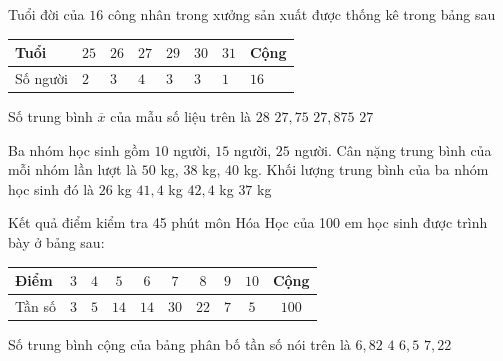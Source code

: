 \begin{ex}%
	Tuổi đời của $16$ công nhân trong xưởng sản xuất được thống kê trong bảng sau\\
	\begin{center}
		\begin{tabular}{|l|l|l|l|l|l|l|l|}
			\hline Tuổi & $25$ & $26$ & $27$ & $29$ & $30$ & $31$ & Cộng \\
			\hline Số người & $2$ & $3$ & $4$ & $3$ & $3$ & $1$ & $16$ \\
			\hline
		\end{tabular}
	\end{center}
	Số trung bình $\overline x $ của mẫu số liệu trên là
	\choice
	{$28$}
	{\True $27{,}75$}
	{$27{,}875$}
	{$27$}
\end{ex}

\begin{ex}%
	Ba nhóm học sinh gồm $10$ người, $15$ người, $25$ người. Cân nặng trung bình của mỗi nhóm lần lượt là $50$ kg, $38$ kg, $40$ kg. Khối lượng trung bình của ba nhóm học sinh đó là
	\choice
	{$26$ kg}
	{\True $41{,}4$ kg}
	{$42{,}4$ kg}
	{$37$ kg}
\end{ex}

\begin{ex}%
	Kết quả điểm kiểm tra 45 phút môn Hóa Học của 100 em học sinh được trình bày ở bảng sau:\\
	\begin{center}
		\begin{tabular}{|l|c|c|c|c|c|c|c|c|c|}
			\hline Điểm & $3$ & $4$ & $5$ & $6$ & $7$ & $8$ & $9$ & $10$ & Cộng \\
			\hline Tần số & $3$ & $5$ & $14$ & $14$ & $30$ & $22$ & $7$ & $5$ & $100$ \\
			\hline
		\end{tabular}
	\end{center}
	Số trung bình cộng của bảng phân bố tần số nói trên là
	\choice
	{\True $6{,}82$}
	{$4$}
	{$6{,}5$}
	{$7{,}22$}
\end{ex}

